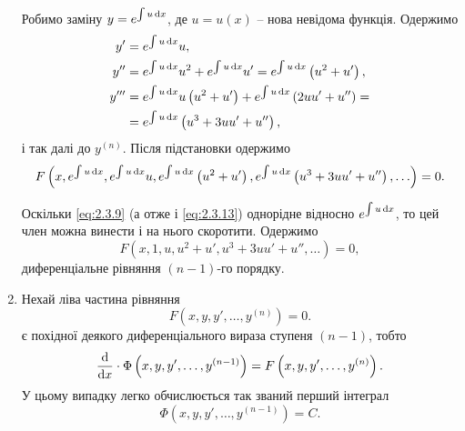 \begin{enumerate}
Робимо заміну $y = e^{\int u \mathop{}\!\mathrm{d} x}$, де $u=u(x)$ -- нова невідома функція. Одержимо
\begin{align}
	\label{eq:2.3.10}
	y' &= e^{\int u \mathop{}\!\mathrm{d} x} u, \\
	\label{eq:2.3.11}
	y^{\prime\prime} &= e^{\int u \mathop{}\!\mathrm{d} x}  u^2 + e^{\int u \mathop{}\!\mathrm{d} x} u' = e^{\int u \mathop{}\!\mathrm{d} x} \left(u^2 + u'\right), \\
	\label{eq:2.3.12}
	y^{\prime\prime\prime} &= e^{\int u \mathop{}\!\mathrm{d} x} u \left( u^2 + u' \right) + e^{\int u \mathop{}\!\mathrm{d} x}  \left(2 u u' + u''\right) = \\ 
	&= e^{\int u \mathop{}\!\mathrm{d} x} \left( u^3 + 3 u u' + u'' \right), \nonumber
\end{align}
і так далі до $y^{(n)}$. Після підстановки одержимо
\begin{equation}
	\label{eq:2.3.13}
	F \left( x, e^{\int u \mathop{}\!\mathrm{d} x}, e^{\int u \mathop{}\!\mathrm{d} x} u, e^{\int u \mathop{}\!\mathrm{d} x} \left(u^2 + u'\right), e^{\int u \mathop{}\!\mathrm{d} x} \left( u^3 + 3 u u' + u'' \right), \ldots \right) = 0.
\end{equation}

Оскільки \eqref{eq:2.3.9} (а отже і \eqref{eq:2.3.13}) однорідне відносно $e^{\int u\mathop{}\!\mathrm{d} x}$, то цей член можна винести і на нього скоротити. Одержимо
\begin{equation}
	\label{eq:2.3.14}
	F \left( x, 1, u, u^2 + u', u^3 + 3 u u' + u'', \ldots \right) = 0,
\end{equation} 
диференціальне рівняння $(n-1)$-го порядку. 
\item Нехай ліва частина рівняння
\begin{equation}
	\label{eq:2.3.15}
	F \left( x, y, y', \ldots, y^{(n)} \right) = 0.
\end{equation}
є похідної деякого диференціального вираза ступеня $(n-1)$, тобто
\begin{equation}
	\label{eq:2.3.16}
	\frac{\mathop{}\!\mathrm{d}}{\mathop{}\!\mathrm{d} x} \cdot \Phi\left( x, y, y', \ldots, y^{(n-1)} \right) = F \left( x, y, y', \ldots, y^{(n)} \right).
\end{equation}
У цьому випадку легко обчислюється так званий перший інтеграл
\begin{equation}
	\label{eq:2.3.17}
	\Phi\left( x, y, y', \ldots, y^{(n-1)} \right) = C.
\end{equation}


\end{enumerate}
